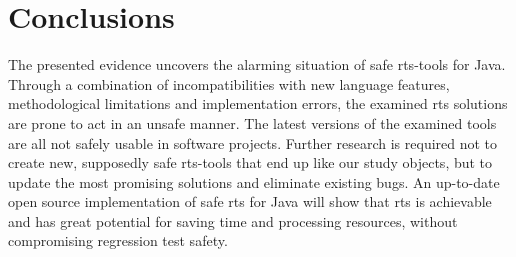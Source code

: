 \section{Conclusions}\label{sec:conclusion}

The presented evidence uncovers the alarming situation of safe \ac{rts}-tools for Java. Through a
combination of incompatibilities with new language features, methodological limitations and
implementation errors, the examined \ac{rts} solutions are
prone to act in an unsafe manner. The latest versions of the examined tools are all not safely usable in software
projects. Further research is required not to create new, supposedly safe \ac{rts}-tools that end up like our study objects,
but to update the most promising solutions and eliminate existing bugs. An up-to-date open source
implementation of safe \ac{rts} for Java will show that \ac{rts} is achievable and
has great potential for saving time and processing resources, without compromising regression test safety.
